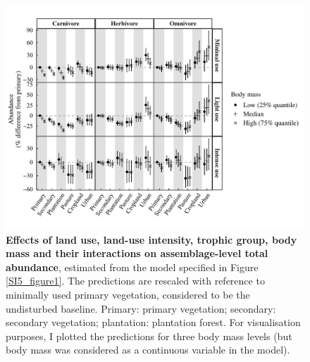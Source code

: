 \begin{figure}[h!]
\centering
\includegraphics[scale=0.9]{Supporting/Chapter5/Figures/Figure_Abundance_difference}
\caption[Effects of land use, land-use intensity, trophic group, body mass and their interactions on assemblage-level total abundance]{\textbf{Effects of land use, land-use intensity, trophic group, body mass and their interactions on assemblage-level total abundance}, estimated from the model specified in Figure \ref{SI5_figure1}. The predictions are rescaled with reference to minimally used primary vegetation, considered to be the undisturbed baseline. Primary: primary vegetation; secondary: secondary vegetation; plantation: plantation forest. For visualisation purposes, I plotted the predictions for three body mass levels (but body mass was considered as a continuous variable in the model).}
\label{SI5_figure2}
\end{figure}



